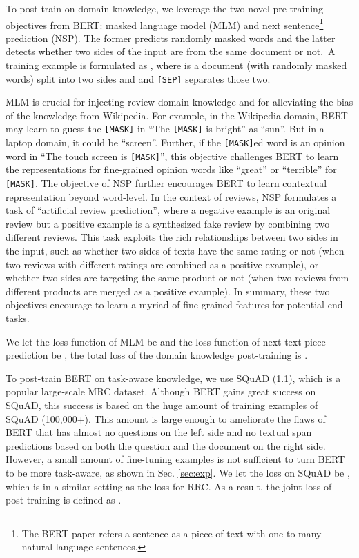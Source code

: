 \documentclass[11pt,a4paper]{article}
\begin{document}
To post-train on domain knowledge, we leverage the two novel pre-training objectives from BERT: masked language model (MLM) and next sentence\footnote{The BERT paper refers a sentence as a piece of text with one to many natural language sentences.} prediction (NSP). The former predicts randomly masked words and the latter detects whether two sides of the input are from the same document or not.~A training example is formulated as , where  is a document (with randomly masked words) split into two sides  and  and \texttt{[SEP]} separates those two.

MLM is crucial for injecting review domain knowledge and for alleviating the bias of the knowledge from Wikipedia. 
For example, in the Wikipedia domain, BERT may learn to guess the \texttt{[MASK]} in ``The \texttt{[MASK]} is bright'' as ``sun''. But in a laptop domain, it could be ``screen''.
Further, if the \texttt{[MASK]}ed word is an opinion word in ``The touch screen is \texttt{[MASK]}'', this objective challenges BERT to learn the representations for fine-grained opinion words like ``great'' or ``terrible'' for \texttt{[MASK]}.
The objective of NSP further encourages BERT to learn contextual representation beyond word-level.
In the context of reviews, NSP formulates a task of ``artificial review prediction'', where a negative example is an original review but a positive example is a synthesized fake review by combining two different reviews.
This task exploits the rich relationships between two sides in the input, such as whether two sides of texts have the same rating or not (when two reviews with different ratings are combined as a positive example), or whether two sides are targeting the same product or not (when two reviews from different products are merged as a positive example).
In summary, these two objectives encourage to learn a myriad of fine-grained features for potential end tasks. 

We let the loss function of MLM be  and the loss function of next text piece prediction be , the total loss of the domain knowledge post-training is .

To post-train BERT on task-aware knowledge, we use SQuAD (1.1), which is a popular large-scale MRC dataset.
Although BERT gains great success on SQuAD, this success is based on the huge amount of training examples of SQuAD (100,000+).
This amount is large enough to ameliorate the flaws of BERT that has almost no questions on the left side and no textual span predictions based on both the question and the document on the right side.
However, a small amount of fine-tuning examples is not sufficient to turn BERT to be more task-aware, as shown in Sec. \ref{sec:exp}.
We let the loss on SQuAD be , which is in a similar setting as the loss  for RRC.
As a result, the joint loss of post-training is defined as .
\end{document}
